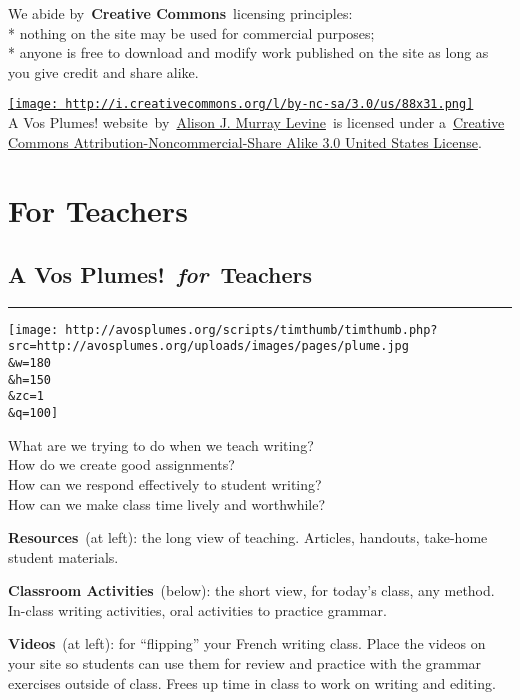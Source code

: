 \documentclass[
  letterpaper,
  DIV=11,
  numbers=noendperiod]{scrreprt}
\begin{document}
We abide by~\textbf{Creative Commons}~licensing principles:\\
* nothing on the site may be used for commercial purposes;\\
* anyone is free to download and modify work published on the site as
long as you give credit and share alike.

\href{http://creativecommons.org/licenses/by-nc-sa/3.0/us/}{\texttt{[image: http://i.creativecommons.org/l/by-nc-sa/3.0/us/88x31.png]}}\\
A Vos Plumes! website~by~\href{http://128.143.20.215/}{Alison J. Murray
Levine}~is licensed under
a~\href{http://creativecommons.org/licenses/by-nc-sa/3.0/us/}{Creative
Commons Attribution-Noncommercial-Share Alike 3.0 United States
License}.

\part{For Teachers}

\hypertarget{a-vos-plumes-for-teachers}{%
\chapter{\texorpdfstring{A Vos
Plumes!~\emph{for}~Teachers}{A Vos Plumes!~for~Teachers}}\label{a-vos-plumes-for-teachers}}

\begin{center}\rule{0.5\linewidth}{0.5pt}\end{center}

\texttt{[image: http://avosplumes.org/scripts/timthumb/timthumb.php?src=http://avosplumes.org/uploads/images/pages/plume.jpg\\\&w=180\\\&h=150\\\&zc=1\\\&q=100]}

What are we trying to do when we teach writing?\\
How do we create good assignments?\\
How can we respond effectively to student writing?\\
How can we make class time lively and worthwhile?

\textbf{Resources}~(at left): the long view of teaching. Articles,
handouts, take-home student materials.

\textbf{Classroom Activities}~(below): the short view, for today's
class, any method. In-class writing activities, oral activities to
practice grammar.

\textbf{Videos}~(at left): for ``flipping'' your French writing class.
Place the videos on your site so students can use them for review and
practice with the grammar exercises outside of class. Frees up time in
class to work on writing and editing.
\end{document}
